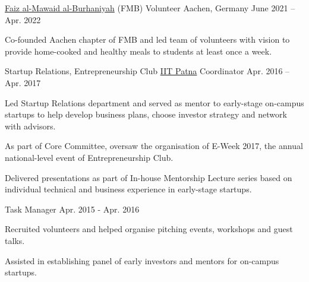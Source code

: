 
\begin{cvpositions}

\cvrole
	{\href{https://www.thedawoodibohras.com/about-the-bohras/faiz-al-mawaid-al-burhaniyah/}{Faiz al-Mawaid al-Burhaniyah} (FMB)} %
	{Volunteer} %
	{Aachen, Germany} %
	{June 2021 -- Apr. 2022} %
	{\begin{cvitems} %
		\item {Co-founded Aachen chapter of FMB and led team of volunteers with vision to provide home-cooked and healthy meals to students at least once a week.}
	\end{cvitems}}


\cvroletwo
	{Startup Relations, Entrepreneurship Club} %
	{\href{https://www.iitp.ac.in}{IIT Patna}} %
	{Coordinator} %
	{Apr. 2016 -- Apr. 2017} %
	{\begin{cvitems} %
		\item {Led Startup Relations department and served as mentor to early-stage on-campus startups to help develop business plans, choose investor strategy and network with advisors.}
		\item {As part of Core Committee, oversaw the organisation of E-Week 2017, the annual national-level event of Entrepreneurship Club.}
		\item {Delivered presentations as part of In-house Mentorship Lecture series based on individual technical and business experience in early-stage startups.}
	\end{cvitems}}
	{Task Manager} %
	{Apr. 2015 - Apr. 2016} %
	{\begin{cvitems} %
		\item {Recruited volunteers and helped organise pitching events, workshops and guest talks.}
		\item {Assisted in establishing panel of early investors and mentors for on-campus startups.}
	\end{cvitems}}

\end{cvpositions}

